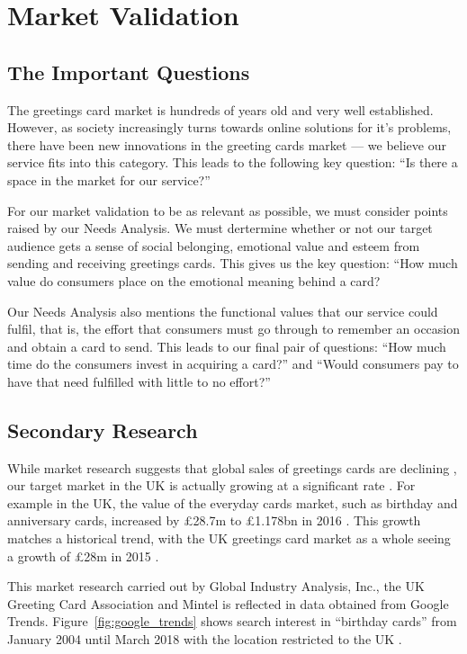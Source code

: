 \documentclass[10pt,a4paper]{article}
\begin{document}
\section*{Market Validation}

\subsection*{The Important Questions}
The greetings card market is hundreds of years old and very well established. However, as society increasingly turns towards online solutions for it's problems, there have been new innovations in the greeting cards market --- we believe our service fits into this category. This leads to the following key question: ``Is there a space in the market for our service?''

For our market validation to be as relevant as possible, we must consider points raised by our Needs Analysis. We must dertermine whether or not our target audience gets a sense of social belonging, emotional value and esteem from sending and receiving greetings cards. This gives us the key question: ``How much value do consumers place on the emotional meaning behind a card?

Our Needs Analysis also mentions the functional values that our service could fulfil, that is, the effort that consumers must go through to remember an occasion and obtain a card to send. This leads to our final pair of questions: ``How much time do the consumers invest in acquiring a card?'' and ``Would consumers pay to have that need fulfilled with little to no effort?''

\subsection*{Secondary Research}
While market research suggests that global sales of greetings cards are declining \citep{strategyr}, our target market in the UK is actually growing at a significant rate \citep{greetingcardassociation}. For example in the UK, the value of the everyday cards market, such as birthday and anniversary cards, increased by \pounds28.7m to \pounds1.178bn in 2016 \citep{greetingcardassociation}. This growth matches a historical trend, with the UK greetings card market as a whole seeing a growth of \pounds28m in 2015 \citep{mintel}.

This market research carried out by Global Industry Analysis, Inc., the UK Greeting Card Association and Mintel is reflected in data obtained from Google Trends. Figure~\ref{fig:google_trends} shows search interest in ``birthday cards'' from January 2004 until March 2018 with the location restricted to the UK \citep{google_trends}.
\end{document}
